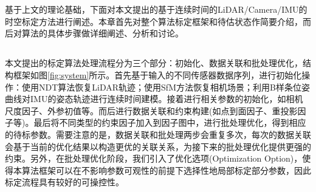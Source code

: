 
\chapter{}
基于上文的理论基础，下面对本文提出的基于连续时间的LiDAR/Camera/IMU的时空标定方法进行阐述。本章首先对整个算法标定框架和待估状态作简要介绍，而后对算法的具体步骤做详细阐述、分析和讨论。

\section{}
\label{subsec:alg_define}
本文提出的标定算法处理流程分为三个部分：初始化、数据关联和批处理优化，结构框架如图\ref{fig:system}所示。首先基于输入的不同传感器数据序列，进行初始化操作：使用NDT算法\cite{biber2003normal}恢复LiDAR轨迹；使用SfM方法\cite{moulon2017openmvg}恢复相机场景；利用B样条位姿曲线对IMU的姿态轨迹进行连续时间建模。接着进行相关参数的初始化，如相机尺度因子、外参初值等。而后进行数据关联和约束构建(如点到面因子、重投影因子等)。最后将不同类型的约束因子加入到因子图中，进行批处理优化，得到相应的待标参数。需要注意的是，数据关联和批处理两步会重复多次，每次的数据关联会基于当前的优化结果以构造更优的关联关系，为接下来的批处理优化提供更强的约束。另外，在批处理优化阶段，我们引入了优化选项(Optimization Option)，使得本算法框架可以在不影响参数可观性的前提下选择性地局部标定部分参数，因此标定流程具有较好的可操控性。

